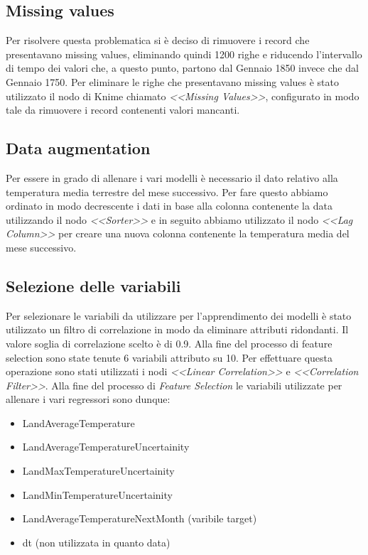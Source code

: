 \documentclass[12pt, a4paper, twocolumn]{article} %
\begin{document}
\subsection{Missing values}
Per risolvere questa problematica si è deciso di rimuovere i record che presentavano missing values, eliminando quindi 1200 righe e riducendo l'intervallo di tempo dei valori che, a questo punto, partono dal Gennaio 1850 invece che dal Gennaio 1750. Per eliminare le righe che presentavano missing values è stato utilizzato il nodo di Knime chiamato \textit{<<Missing Values>>}, configurato in modo tale da rimuovere i record contenenti valori mancanti.

\subsection{Data augmentation}
Per essere in grado di allenare i vari modelli è necessario il dato relativo alla temperatura media terrestre del mese successivo. Per fare questo abbiamo ordinato in modo decrescente i dati in base alla colonna contenente la data utilizzando il nodo \textit{<<Sorter>>} e in seguito abbiamo utilizzato il nodo \textit{<<Lag Column>>} per creare una nuova colonna contenente la temperatura media del mese successivo.

\subsection{Selezione delle variabili}
Per selezionare le variabili da utilizzare per l'apprendimento dei modelli è stato utilizzato un filtro di correlazione in modo da eliminare attributi ridondanti. Il valore soglia di correlazione scelto è di 0.9. Alla fine del processo di feature selection sono state tenute 6 variabili attributo su 10. Per effettuare questa operazione sono stati utilizzati i nodi \textit{<<Linear Correlation>>} e \textit{<<Correlation Filter>>}. Alla fine del processo di \textit{Feature Selection} le variabili utilizzate per allenare i vari regressori sono dunque: 
\begin{itemize}
	\item LandAverageTemperature
	\item LandAverageTemperatureUncertainity
	\item LandMaxTemperatureUncertainity
	\item LandMinTemperatureUncertainity
	\item LandAverageTemperatureNextMonth (varibile target)
	\item dt (non utilizzata in quanto data)
\end{itemize}
\end{document}
